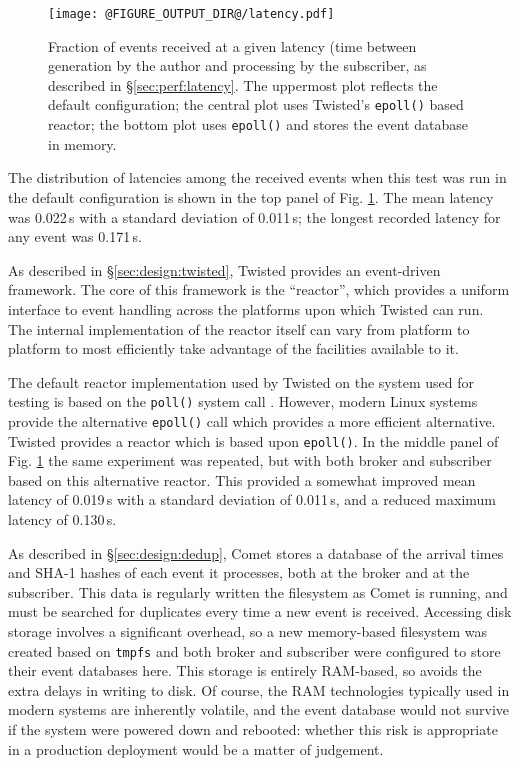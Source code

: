 \documentclass[5p,authoryear]{elsarticle}
\begin{document}
\begin{figure}
  \begin{center}
  \texttt{[image: @FIGURE\_OUTPUT\_DIR@/latency.pdf]}
  \end{center}

  \caption{Fraction of events received at a given latency (time between
  generation by the author and processing by the subscriber, as described in
  \S\ref{sec:perf:latency}. The uppermost plot reflects the default
  configuration; the central plot uses Twisted's \texttt{epoll()} based
  reactor; the bottom plot uses \texttt{epoll()} and stores the event database
  in memory.}

  \label{fig:latency}
\end{figure}

The distribution of latencies among the received events when this test was run
in the default configuration is shown in the top panel of Fig.
\ref{fig:latency}. The mean latency was 0.022\,s with a standard deviation of
0.011\,s; the longest recorded latency for any event was 0.171\,s.

As described in \S\ref{sec:design:twisted}, Twisted provides an event-driven
framework. The core of this framework is the ``reactor'', which provides a
uniform interface to event handling across the platforms upon which Twisted
can run. The internal implementation of the reactor itself can vary from
platform to platform to most efficiently take advantage of the facilities
available to it.

The default reactor implementation used by Twisted on the system used for
testing is based on the \texttt{poll()} system call \citep{Posix1:2013}.
However, modern Linux systems provide the alternative \texttt{epoll()} call
\citep{Kerrisk:2014} which provides a more efficient alternative. Twisted
provides a reactor which is based upon \texttt{epoll()}. In the middle panel of
Fig. \ref{fig:latency} the same experiment was repeated, but with both broker
and subscriber based on this alternative reactor. This provided a somewhat
improved mean latency of 0.019\,s with a standard deviation of 0.011\,s, and a
reduced maximum latency of 0.130\,s.

As described in \S\ref{sec:design:dedup}, Comet stores a database of the
arrival times and SHA-1 hashes of each event it processes, both at the broker
and at the subscriber. This data is regularly written the filesystem as Comet
is running, and must be searched for duplicates every time a new event is
received. Accessing disk storage involves a significant overhead, so a new
memory-based filesystem was created based on \texttt{tmpfs}
\citep{Kerrisk:2014} and both broker and subscriber were configured to store
their event databases here. This storage is entirely RAM-based, so avoids the
extra delays in writing to disk. Of course, the RAM technologies typically
used in modern systems are inherently volatile, and the event database would
not survive if the system were powered down and rebooted: whether this risk is
appropriate in a production deployment would be a matter of judgement.
\end{document}
